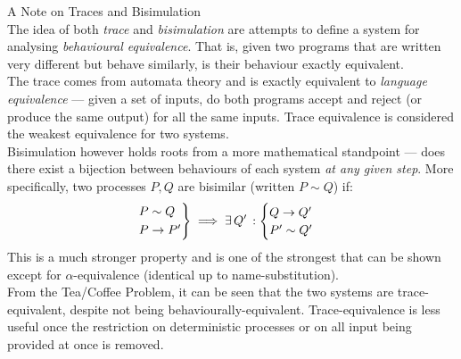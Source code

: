     \begin{remark*}{A Note on Traces and Bisimulation\\}
        The idea of both \textit{trace} and \textit{bisimulation} are attempts to define a system for analysing \textit{behavioural equivalence}.
        That is, given two programs that are written very different but behave similarly, is their behaviour exactly equivalent. \\

        The trace comes from automata theory and is exactly equivalent to \textit{language equivalence} --- given a set of inputs, do both programs accept and reject (or produce the same output) for all the same inputs.
        Trace equivalence is considered the weakest equivalence for two systems. \\

        Bisimulation however holds roots from a more mathematical standpoint --- does there exist a bijection between behaviours of each system \textit{at any given step}.
        More specifically, two processes $P, Q$ are bisimilar (written $P \sim Q$) if:
        \begin{equation*}
            \begin{rcases}
                P \sim Q \\
                P \rightarrow P' \\
            \end{rcases} \implies \exists \, Q' \, :
            \begin{cases}
                Q \rightarrow Q' \\
                P' \sim Q' \\
            \end{cases}
        \end{equation*}
        This is a much stronger property and is one of the strongest that can be shown except for $\alpha$-equivalence (identical up to name-substitution). \\
        
        From the Tea/Coffee Problem, it can be seen that the two systems are trace-equivalent, despite not being behaviourally-equivalent.
        Trace-equivalence is less useful once the restriction on deterministic processes or on all input being provided at once is removed.
    \end{remark*}


